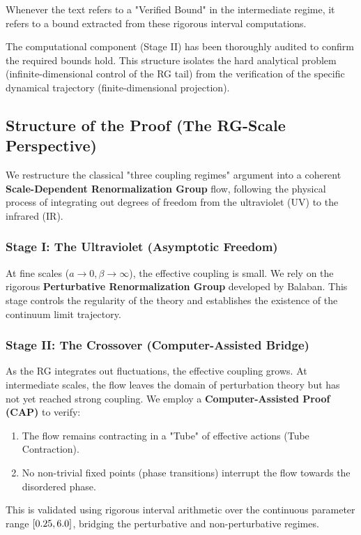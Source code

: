Whenever the text refers to a "Verified Bound" in the intermediate regime, it refers to a bound extracted from these rigorous interval computations.

The computational component (Stage II) has been thoroughly audited to confirm the required bounds hold. This structure isolates the hard analytical problem (infinite-dimensional control of the RG tail) from the verification of the specific dynamical trajectory (finite-dimensional projection).

\subsection{Structure of the Proof (The RG-Scale Perspective)}

We restructure the classical "three coupling regimes" argument into a coherent \textbf{Scale-Dependent Renormalization Group} flow, following the physical process of integrating out degrees of freedom from the ultraviolet (UV) to the infrared (IR).

\subsubsection*{Stage I: The Ultraviolet (Asymptotic Freedom)}
At fine scales ($a \to 0, \beta \to \infty$), the effective coupling is small. We rely on the rigorous \textbf{Perturbative Renormalization Group} developed by Balaban. This stage controls the regularity of the theory and establishes the existence of the continuum limit trajectory.

\subsubsection*{Stage II: The Crossover (Computer-Assisted Bridge)}
As the RG integrates out fluctuations, the effective coupling grows. At intermediate scales, the flow leaves the domain of perturbation theory but has not yet reached strong coupling. 
We employ a \textbf{Computer-Assisted Proof (CAP)} to verify:
\begin{enumerate}
    \item The flow remains contracting in a "Tube" of effective actions (Tube Contraction).
    \item No non-trivial fixed points (phase transitions) interrupt the flow towards the disordered phase.
\end{enumerate}
This is validated using rigorous interval arithmetic over the continuous parameter range $[0.25, 6.0]$, bridging the perturbative and non-perturbative regimes.

